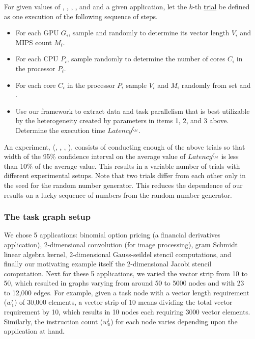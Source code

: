 For given values of \numtplgynodes, \gpunum, \veclenset, \corenumset,
and \mipsset and a given application, let the $k$-th \ul{trial} be
defined as one execution of the following sequence of steps.

\begin{itemize}

\item For each GPU $G_i$, sample \veclenset and \mipsset randomly to
  determine its vector length $V_i$ and MIPS count $M_i$. \label{i1}

\item For each CPU $P_i$, sample \corenumset randomly to determine the
  number of cores $C_i$ in the processor $P_i$.~\label{i2}

\item For each core $C_i$ in the processor $P_i$ sample $V_i$ and $M_i$
  randomly from set \veclenset and \mipsset.

\item Use our framework to extract data and task parallelism that is
  best utilizable by the heterogeneity created by parameters in items 1,
  2, and 3 above. Determine the execution time
  $Latency^{\zeta_\mathcal{M}}$.

\end{itemize}

An experiment, \expt(\numtplgynodes, \gpunum, \veclenset, \corenumset
\mipsset), consists of conducting enough of the above trials so that
width of the 95\% confidence interval on the average value of
$Latency^{\zeta_\mathcal{M}}$ is less than 10\% of the average
value. This results in a variable number of trials with different
experimental setups. Note that two trials differ from each other only in
the seed for the random number generator.  This reduces the dependence
of our results on a lucky sequence of numbers from the random number
generator.

\subsubsection{The task graph setup}
\label{sec:task-graph-setup}

We chose 5 applications: binomial option pricing (a financial
derivatives application), 2-dimensional convolution (for image
processing), gram Schmidt linear algebra kernel, 2-dimensional
Gauss-seildel stencil computations, and finally our motivating example
itself the 2-dimensional Jacobi stencil computation. Next for these 5
applications, we varied the vector strip from 10 to 50, which resulted
in graphs varying from around 50 to 5000 nodes and with 23 to 12,000
edges. For example, given a task node with a vector length requirement
($w^i_1$) of 30,000 elements, a vector strip of 10 means dividing the
total vector requirement by 10, which results in 10 nodes each requiring
3000 vector elements. Similarly, the instruction count ($w^i_0$) for
each node varies depending upon the application at hand.

